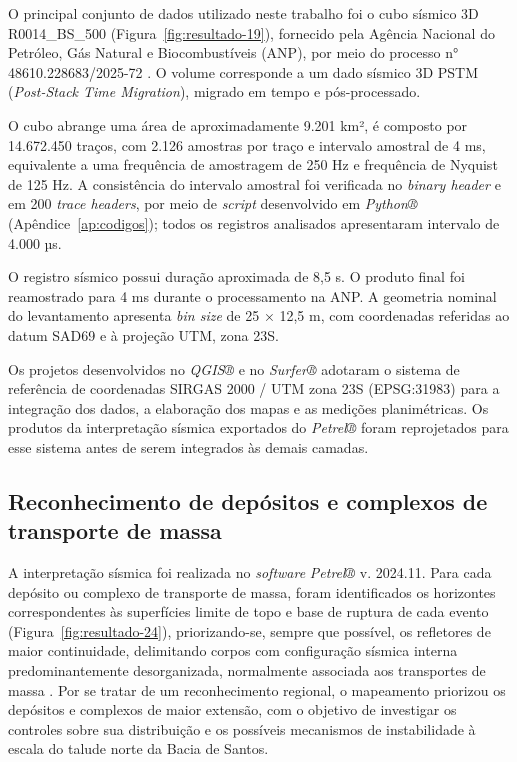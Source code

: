 O principal conjunto de dados utilizado neste trabalho foi o cubo sísmico 3D R0014\_BS\_500 (Figura~\ref{fig:resultado-19}), fornecido pela Agência Nacional do Petróleo, Gás Natural e Biocombustíveis (ANP), por meio do processo n° 48610.228683/2025-72 . O volume corresponde a um dado sísmico 3D PSTM (\textit{Post-Stack Time Migration}), migrado em tempo e pós-processado.

O cubo abrange uma área de aproximadamente 9.201 km², é composto por 14.672.450 traços, com 2.126 amostras por traço e intervalo amostral de 4 ms, equivalente a uma frequência de amostragem de 250 Hz e frequência de Nyquist de 125 Hz. A consistência do intervalo amostral foi verificada no \textit{binary header} e em 200 \textit{trace headers}, por meio de \textit{script} desenvolvido em \textit{Python®} (Apêndice~\ref{ap:codigos}); todos os registros analisados apresentaram intervalo de 4.000 µs.

O registro sísmico possui duração aproximada de 8,5 s. O produto final foi reamostrado para 4 ms durante o processamento na ANP. A geometria nominal do levantamento apresenta \textit{bin size} de 25 × 12,5 m, com coordenadas referidas ao datum SAD69 e à projeção UTM, zona 23S.

Os projetos desenvolvidos no \textit{QGIS®} e no \textit{Surfer®} adotaram o sistema de referência de coordenadas SIRGAS 2000 / UTM zona 23S (EPSG:31983) para a integração dos dados, a elaboração dos mapas e as medições planimétricas. Os produtos da interpretação sísmica exportados do \textit{Petrel®} foram reprojetados para esse sistema antes de serem integrados às demais camadas.

\subsection{Reconhecimento de depósitos e complexos de transporte de massa}\label{sec:4-1-1}

A interpretação sísmica foi realizada no \textit{software} \textit{Petrel®} v. 2024.11. Para cada depósito ou complexo de transporte de massa, foram identificados os horizontes correspondentes às superfícies limite de topo e base de ruptura de cada evento (Figura~\ref{fig:resultado-24}), priorizando-se, sempre que possível, os refletores de maior continuidade, delimitando corpos com configuração sísmica interna predominantemente desorganizada, normalmente associada aos transportes de massa \cite{posamentier2011}. Por se tratar de um reconhecimento regional, o mapeamento priorizou os depósitos e complexos de maior extensão, com o objetivo de investigar os controles sobre sua distribuição e os possíveis mecanismos de instabilidade à escala do talude norte da Bacia de Santos.

